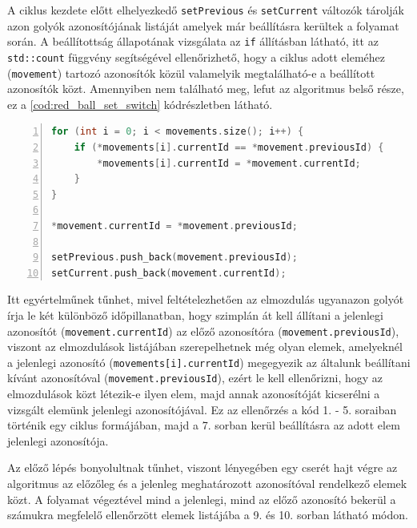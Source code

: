 \par A ciklus kezdete előtt elhelyezkedő \lstinline{setPrevious} és \lstinline{setCurrent} változók tárolják azon golyók azonosítójának listáját amelyek már beállításra kerültek a folyamat során. A beállítottság állapotának vizsgálata az \lstinline{if} állításban látható, itt az \lstinline{std::count} függvény segítségével ellenőrizhető, hogy a ciklus adott eleméhez (\lstinline{movement}) tartozó azonosítók közül valamelyik megtalálható-e a beállított azonosítók közt. Amennyiben nem található meg, lefut az algoritmus belső része, ez a \ref{cod:red_ball_set_switch} kódrészletben látható.

\vspace{2mm}
\hspace{-10mm}
\begin{minipage}{\linewidth}
\begin{lstlisting}[language=C++, numbers=left, caption={A piros golyók azonosítójának beállítása.}, label={cod:red_ball_set_switch}]
for (int i = 0; i < movements.size(); i++) {
    if (*movements[i].currentId == *movement.previousId) {
        *movements[i].currentId = *movement.currentId;
    }
}

*movement.currentId = *movement.previousId;

setPrevious.push_back(movement.previousId);
setCurrent.push_back(movement.currentId);
\end{lstlisting}
\end{minipage}

\par Itt egyértelműnek tűnhet, mivel feltételezhetően az elmozdulás ugyanazon golyót írja le két különböző időpillanatban, hogy szimplán át kell állítani a jelenlegi azonosítót (\lstinline{movement.currentId}) az előző azonosítóra (\lstinline{movement.previousId}), viszont az elmozdulások listájában szerepelhetnek még olyan elemek, amelyeknél a jelenlegi azonosító (\lstinline{movements[i].currentId}) megegyezik az általunk beállítani kívánt azonosítóval (\lstinline{movement.previousId}), ezért le kell ellenőrizni, hogy az elmozdulások közt létezik-e ilyen elem, majd annak azonosítóját kicserélni a vizsgált elemünk jelenlegi azonosítójával. Ez az ellenőrzés a kód 1. - 5. soraiban történik egy ciklus formájában, majd a 7. sorban kerül beállításra az adott elem jelenlegi azonosítója.
\par Az előző lépés bonyolultnak tűnhet, viszont lényegében egy cserét hajt végre az algoritmus az előzőleg és a jelenleg meghatározott azonosítóval rendelkező elemek közt. A folyamat végeztével mind a jelenlegi, mind az előző azonosító bekerül a számukra megfelelő ellenőrzött elemek listájába a 9. és 10. sorban látható módon.